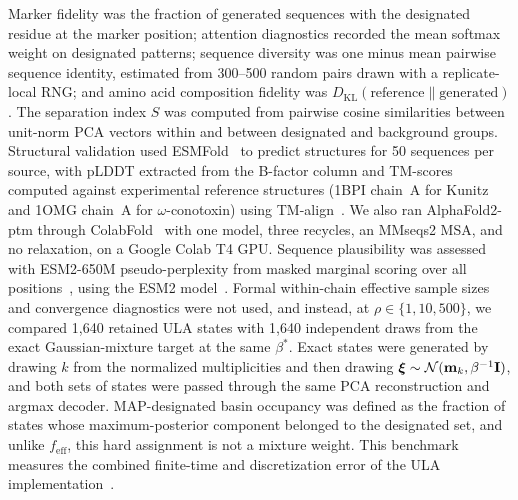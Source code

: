 Marker fidelity was the fraction of generated sequences with the designated residue at the
marker position; attention diagnostics recorded the mean softmax weight on designated patterns;
sequence diversity was one minus mean pairwise sequence identity, estimated from 300--500
random pairs drawn with a replicate-local RNG; and amino acid composition fidelity was
$D_{\mathrm{KL}}(\text{reference}\parallel\text{generated})$. The separation
index $S$ was computed from pairwise cosine similarities between unit-norm PCA vectors within
and between designated and background groups. Structural validation used
ESMFold~\cite{esmfold2022} to predict structures for 50 sequences per source, with pLDDT
extracted from the B-factor column and TM-scores computed against experimental reference
structures (1BPI chain~A for Kunitz and 1OMG chain~A for $\omega$-conotoxin) using
TM-align~\cite{tmAlign2005}. We also ran AlphaFold2-ptm through
ColabFold~\cite{jumperHighlyAccurate2021,mirdita2022colabfold} with one model, three recycles,
an MMseqs2 MSA, and no relaxation, on a Google Colab T4 GPU. Sequence
plausibility was assessed with ESM2-650M pseudo-perplexity from masked marginal scoring over all
positions~\cite{meierZeroShot2021}, using the ESM2 model~\cite{esmfold2022}. Formal within-chain effective sample sizes and convergence
diagnostics were not used, and instead, at $\rho\in\{1,10,500\}$, we compared
1{,}640 retained ULA states with 1{,}640 independent draws from the exact
Gaussian-mixture target at the same $\beta^{*}$. Exact states were generated by drawing
$k$ from the normalized multiplicities and then drawing
$\bm{\xi}\sim\mathcal{N}(\mathbf{m}_k,\beta^{-1}\mathbf{I})$, and both sets of states were passed
through the same PCA reconstruction and argmax decoder. MAP-designated basin occupancy
was defined as the fraction of states whose maximum-posterior component belonged to the
designated set, and unlike $f_{\mathrm{eff}}$, this hard assignment is not a mixture weight.
This benchmark measures the combined finite-time and discretization error of the ULA
implementation~\cite{durmusMoulinesULA2017}.

